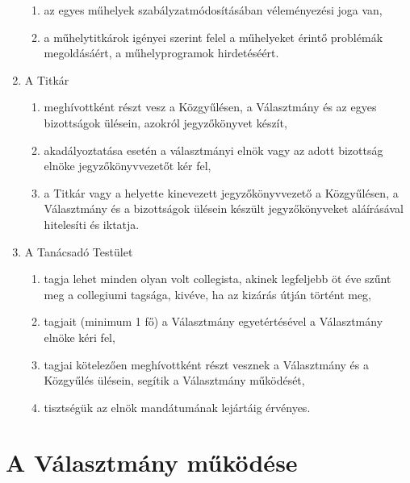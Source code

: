 \documentclass{rulebook}
\begin{document}
\begin{enumerate}
\begin{enumerate}
		\item az egyes műhelyek szabályzatmódosításában véleményezési joga van,
		\item a műhelytitkárok igényei szerint felel a műhelyeket érintő problémák megoldásáért, a műhelyprogramok hirdetéséért.
	\end{enumerate}
	\item  A Titkár
	\begin{enumerate}	
		\item meghívottként részt vesz a Közgyűlésen, a Választmány és az egyes bizottságok ülésein, azokról jegyzőkönyvet készít,
		\item akadályoztatása esetén a választmányi elnök vagy az adott bizottság elnöke jegyzőkönyvvezetőt kér fel,
		\item a Titkár vagy a helyette kinevezett jegyzőkönyvvezető a Közgyűlésen, a Választmány és a bizottságok ülésein készült jegyzőkönyveket aláírásával hitelesíti és iktatja.
	\end{enumerate}
	\item  A Tanácsadó Testület
	\begin{enumerate}	
		\item tagja lehet minden olyan volt collegista, akinek legfeljebb öt éve szűnt meg a collegiumi tagsága, kivéve, ha az kizárás útján történt meg,
		\item tagjait (minimum 1 fő) a Választmány egyetértésével a Választmány elnöke kéri fel,
		\item tagjai kötelezően meghívottként részt vesznek a Választmány és a Közgyűlés ülésein, segítik a Választmány működését,
		\item tisztségük az elnök mandátumának lejártáig érvényes.
	\end{enumerate}
\end{enumerate}


\section{A Választmány működése}
\end{document}
